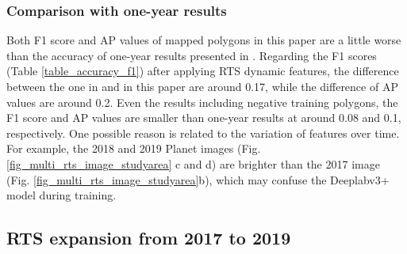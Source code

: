 \documentclass[authoryear,preprint,review,12pt]{elsarticle}
\begin{document}

\subsubsection{Comparison with one-year results}
\label{sec_compare_with_201805_results}

Both F1 score and AP values of mapped polygons in this paper are a little worse than the accuracy of one-year results presented in \cite{huang2020using}. 
Regarding the F1 scores (Table \ref{table_accuracy_f1}) after applying RTS dynamic features, the difference between the one in \cite{huang2020using} and in this paper are around 0.17, while the difference of AP values are around 0.2.
Even the results including negative training polygons, the F1 score and AP values are smaller than one-year results at around 0.08 and 0.1, respectively. 
One possible reason is related to the variation of features over time. 
For example, the 2018 and 2019 Planet images (Fig. \ref{fig_multi_rts_image_studyarea} c and d) are brighter than the 2017 image (Fig. \ref{fig_multi_rts_image_studyarea}b), which may confuse the Deeplabv3+ model during training. 



\subsection{RTS expansion from 2017 to 2019}
\label{sec_rts_expanding}
\end{document}
